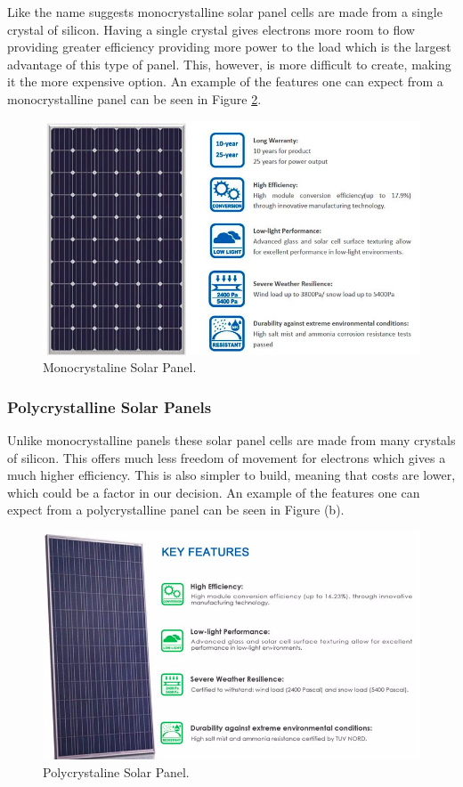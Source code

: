 Like the name suggests monocrystalline solar panel cells are made from a single crystal of silicon. Having a single crystal gives electrons more room to flow providing greater efficiency providing more power to the load which is the largest advantage of this type of panel. This, however, is more difficult to create, making it the more expensive option. An example of the features one can expect from a monocrystalline panel can be seen in Figure \ref{solar-panel-overview}. 
\begin{figure}
    \centering
    \includegraphics[scale=0.5]{figures/monocrystaline.png}
    \caption{Monocrystaline Solar Panel.}
    \label{solar-panel-overview} 
\end{figure}
\subsubsection{Polycrystalline Solar Panels}

Unlike monocrystalline panels these solar panel cells are made from many crystals of silicon. This offers much less freedom of movement for electrons which gives a much higher efficiency. This is also simpler to build, meaning that costs are lower, which could be a factor in our decision. An example of the features one can expect from a polycrystalline panel can be seen in Figure (b). 
\begin{figure}
    \centering
    \includegraphics[scale=0.5]{figures/polycrystaline solar.png}
    \caption{Polycrystaline Solar Panel.}
    \label{solar-panel-overview} 
\end{figure}
